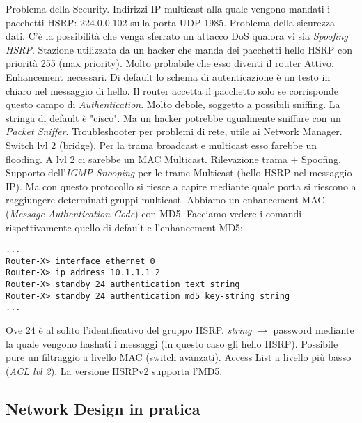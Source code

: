 Problema della Security. Indirizzi IP multicast alla quale vengono mandati i pacchetti HSRP: 224.0.0.102 sulla porta UDP 1985. Problema della sicurezza dati. C'è la possibilità che venga sferrato un attacco DoS qualora vi sia \textit{Spoofing HSRP}. Stazione utilizzata da un hacker che manda dei pacchetti hello HSRP con priorità 255 (max priority). Molto probabile che esso diventi il router Attivo. Enhancement necessari. Di default lo schema di autenticazione è un testo in chiaro nel messaggio di hello. Il router accetta il pacchetto solo se corrisponde questo campo di \textit{Authentication}. Molto debole, soggetto a possibili sniffing. La stringa di default è "cisco". Ma un hacker potrebbe ugualmente sniffare con un \textit{Packet Sniffer}. Troubleshooter per problemi di rete, utile ai Network Manager. Switch lvl 2 (bridge). Per la trama broadcast e multicast esso farebbe un flooding. A lvl 2 ci sarebbe un MAC Multicast. Rilevazione trama + Spoofing. Supporto dell'\textit{IGMP Snooping} per le trame Multicast (hello HSRP nel messaggio IP). Ma con questo protocollo si riesce a capire mediante quale porta si riescono a raggiungere determinati gruppi multicast. Abbiamo un enhancement MAC (\textit{Message Authentication Code}) con MD5. Facciamo vedere i comandi rispettivamente quello di default e l'enhancement MD5:

\begin{lstlisting}[language=CISCO]
...
Router-X> interface ethernet 0
Router-X> ip address 10.1.1.1 2
Router-X> standby 24 authentication text string
Router-X> standby 24 authentication md5 key-string string
...
\end{lstlisting}


Ove 24 è al solito l'identificativo del gruppo HSRP. \textit{string} $\rightarrow$ password mediante la quale vengono hashati i messaggi (in questo caso gli hello HSRP). Possibile pure un filtraggio a livello MAC (switch avanzati). Access List a livello più basso (\textit{ACL lvl 2}). La versione HSRPv2 supporta l'MD5.

\subsection{Network Design in pratica}

